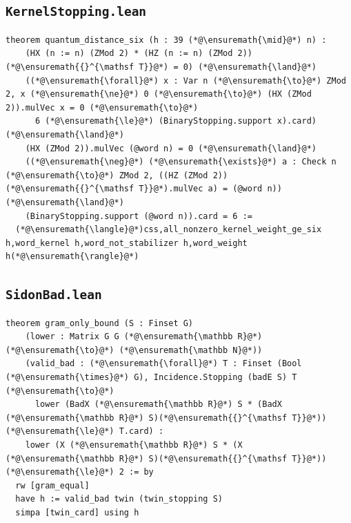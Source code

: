 \subsection*{\texttt{KernelStopping.lean}}
\begin{lstlisting}
theorem quantum_distance_six (h : 39 (*@\ensuremath{\mid}@*) n) :
    (HX (n := n) (ZMod 2) * (HZ (n := n) (ZMod 2))(*@\ensuremath{{}^{\mathsf T}}@*) = 0) (*@\ensuremath{\land}@*)
    ((*@\ensuremath{\forall}@*) x : Var n (*@\ensuremath{\to}@*) ZMod 2, x (*@\ensuremath{\ne}@*) 0 (*@\ensuremath{\to}@*) (HX (ZMod 2)).mulVec x = 0 (*@\ensuremath{\to}@*)
      6 (*@\ensuremath{\le}@*) (BinaryStopping.support x).card) (*@\ensuremath{\land}@*)
    (HX (ZMod 2)).mulVec (@word n) = 0 (*@\ensuremath{\land}@*)
    ((*@\ensuremath{\neg}@*) (*@\ensuremath{\exists}@*) a : Check n (*@\ensuremath{\to}@*) ZMod 2, ((HZ (ZMod 2))(*@\ensuremath{{}^{\mathsf T}}@*).mulVec a) = (@word n)) (*@\ensuremath{\land}@*)
    (BinaryStopping.support (@word n)).card = 6 :=
  (*@\ensuremath{\langle}@*)css,all_nonzero_kernel_weight_ge_six h,word_kernel h,word_not_stabilizer h,word_weight h(*@\ensuremath{\rangle}@*)
\end{lstlisting}
\subsection*{\texttt{SidonBad.lean}}
\begin{lstlisting}
theorem gram_only_bound (S : Finset G)
    (lower : Matrix G G (*@\ensuremath{\mathbb R}@*) (*@\ensuremath{\to}@*) (*@\ensuremath{\mathbb N}@*))
    (valid_bad : (*@\ensuremath{\forall}@*) T : Finset (Bool (*@\ensuremath{\times}@*) G), Incidence.Stopping (badE S) T (*@\ensuremath{\to}@*)
      lower (BadX (*@\ensuremath{\mathbb R}@*) S * (BadX (*@\ensuremath{\mathbb R}@*) S)(*@\ensuremath{{}^{\mathsf T}}@*)) (*@\ensuremath{\le}@*) T.card) :
    lower (X (*@\ensuremath{\mathbb R}@*) S * (X (*@\ensuremath{\mathbb R}@*) S)(*@\ensuremath{{}^{\mathsf T}}@*)) (*@\ensuremath{\le}@*) 2 := by
  rw [gram_equal]
  have h := valid_bad twin (twin_stopping S)
  simpa [twin_card] using h
\end{lstlisting}

